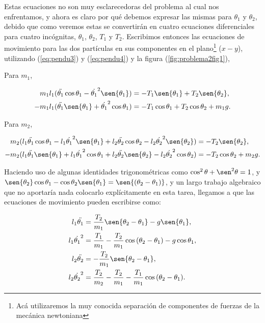 \documentclass[a4paper,10pt]{article}
\numberwithin{equation}{section}
\begin{document}
Estas ecuaciones no son muy esclarecedoras del problema al cual nos enfrentamos, y ahora 
es claro por qué debemos expresar las mismas para $\theta_1$ y $\theta_2$, debido que como 
veremos estas se convertirán en cuatro ecuaciones diferenciales para cuatro incógnitas, 
$\theta_1$, $\theta_2$, $T_1$ y $T_2$. Escribimos entonces las ecuaciones de movimiento 
para las dos partículas en sus componentes en el plano\footnote{Acá utilizaremos la muy conocida separación
de componentes de fuerzas de la mecánica newtoniana} ($x-y$), utilizando (\ref{eq:pendu3}) y (\ref{eq:pendu4}) y 
la figura (\ref{fig:problema2fig1}),

Para $m_1$,

\begin{align}
 m_1 l_1 (\ddot{\theta_1}\cos{\theta_1} - \dot{\theta_1}^2\sen{\theta_1}) &= - T_1 \sen{\theta_1} + T_2 \sen{\theta_2}, \\
 -m_1 l_1 (\ddot{\theta_1}\sen{\theta_1} + \dot{\theta_1}^2\cos{\theta_1}) &= - T_1 \cos{\theta_1} + T_2 \cos{\theta_2} + m_1 g.
\end{align}

Para $m_2$,

\begin{align}
 m_2(l_1\ddot{\theta_1}\cos{\theta_1} - l_1\dot{\theta_1}^2\sen{\theta_1} + l_2\ddot{\theta_2}\cos{\theta_2} - l_2\dot{\theta_2}^2\sen{\theta_2})
 &= - T_2 \sen{\theta_2}, \\
 - m_2(l_1\ddot{\theta_1}\sen{\theta_1} + l_1\dot{\theta_1}^2\cos{\theta_1} + l_2\ddot{\theta_2}\sen{\theta_2} - l_2\dot{\theta_2}^2\cos{\theta_2})
 &= - T_2 \cos{\theta_2} + m_2 g.
\end{align}

Haciendo uso de algunas identidades trigonométricas como $\cos^2{\theta} +  \sen^2{\theta} = 1$, y
$\sen{\theta_2}\cos{\theta_1} - \cos{\theta_2}\sen{\theta_1} = \sen{(\theta_2 - \theta_1)}$, 
y un largo trabajo algebraico que no aportaría nada colocarlo explícitamente en esta tarea,
llegamos a que las ecuaciones de movimiento pueden escribirse como:

\begin{align}
  \label{eq:pendu7} %
 l_1\ddot{\theta_1} &= \frac{T_2}{m_1}\sen{\theta_2 - \theta_1} - g \sen{\theta_1}, \\
 \label{eq:pendu8} %
 l_1\dot{\theta_1}^2 &= \frac{T_1}{m_1} - \frac{T_2}{m_1}\cos{(\theta_2 - \theta_1)} - g \cos{\theta_1}, \\
  \label{eq:pendu9} %
 l_2\ddot{\theta_2} &= - \frac{T_2}{m_1}\sen{\theta_2 - \theta_1}, \\
  \label{eq:pendu10} %
 l_2\dot{\theta_2}^2 &= \frac{T_2}{m_2} - \frac{T_2}{m_1} - \frac{T_1}{m_1}\cos{(\theta_2 - \theta_1)}.
 \end{align}
\end{document}
